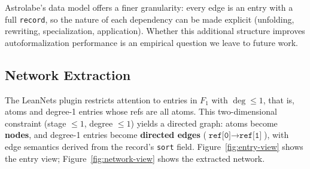 Astrolabe's data model offers a finer granularity: every edge is an entry with a full \texttt{record}, so the nature of each dependency can be made explicit (unfolding, rewriting, specialization, application). Whether this additional structure improves autoformalization performance is an empirical question we leave to future work.

\subsection{Network Extraction}
The LeanNets plugin restricts attention to entries in $F_1$ with $\deg \leq 1$, that is, atoms and degree-1 entries whose refs are all atoms. This two-dimensional constraint (stage $\leq 1$, degree $\leq 1$) yields a directed graph: atoms become \textbf{nodes}, and degree-1 entries become \textbf{directed edges} ($\texttt{ref[0]} \to \texttt{ref[1]}$), with edge semantics derived from the record's \texttt{sort} field. Figure~\ref{fig:entry-view} shows the entry view; Figure~\ref{fig:network-view} shows the extracted network.

